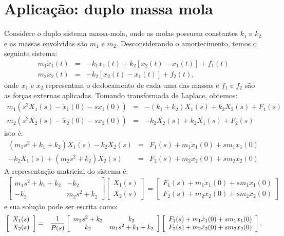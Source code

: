 \section{Aplicação: duplo massa mola}

Considere o duplo sistema massa-mola, onde as molas possuem constantes $k_1$ e $k_2$ e as massas envolvidas são $m_1$ e $m_2$. Desconsiderando o amortecimento, temos o seguinte sistema:
\begin{eqnarray*}
 m_1 \ddot{x}_1(t) &=&  - k_1 x_1(t) + k_2\left[x_2(t)-x_1(t)\right]+f_1(t)\\
 m_2 \ddot{x}_2(t) &=&  - k_2\left[x_2(t)-x_1(t)\right]+f_2(t),
\end{eqnarray*}
onde $x_1$ e $x_2$ representam o deslocamento de cada uma das massas e $f_1$ e $f_2$ são as forças externas aplicadas. Tomando transformada de Laplace, obtemos:
\begin{eqnarray*}
 m_1 (s^2X_1(s)-\dot{x}_1(0)-sx_1(0)) &=&  - (k_1+k_2) X_1(s) + k_2X_2(s)+F_1(s)\\
 m_2 (s^2X_2(s)-\dot{x}_2(0)-sx_2(0)) &=&  - k_2X_2(s)+k_2X_1(s)+F_2(s)
\end{eqnarray*}
isto é:
\begin{eqnarray*}
 \left(m_1 s^2+k_1+k_2\right)X_1(s)- k_2X_2(s) &=&   F_1(s)+m_1\dot{x}_1(0)+sm_1x_1(0)\\
 -k_2X_1(s)+\left(m_2 s^2+k_2\right)X_2(s) &=&  F_2(s)+m_2\dot{x}_2(0)+sm_2x_2(0)
\end{eqnarray*}
A representação matricial do sistema é:
\begin{eqnarray*}
\left[\begin{array}{cc}
       m_1 s^2+k_1+k_2 &- k_2\\
 -k_2&      m_2 s^2+k_2
      \end{array}
\right]
\left[\begin{array}{c}
       X_1(s)\\
       X_2(s)
      \end{array}
\right]=\left[\begin{array}{c}
F_1(s)+m_1\dot{x}_1(0)+sm_1x_1(0)\\  
F_2(s)+m_2\dot{x}_2(0)+sm_2x_2(0)
       \end{array}
\right]
\end{eqnarray*}
e sua solução pode ser escrita como:
\begin{eqnarray}{\label{eq_transf_2_massa_mola}}
\left[\begin{array}{c}
       X_1(s)\\
       X_2(s)
      \end{array}
\right]
&=&\frac{1}{P(s)}
\left[\begin{array}{cc}
       m_2s^2+k_2 & k_2\\
 k_2&      m_1 s^2+k_1+k_2
      \end{array}
\right]
\left[\begin{array}{c}
F_1(s)+m_1\dot{x}_1(0)+sm_1x_1(0)\\  
F_2(s)+m_2\dot{x}_2(0)+sm_2x_2(0)
       \end{array}
\right],
\end{eqnarray}
